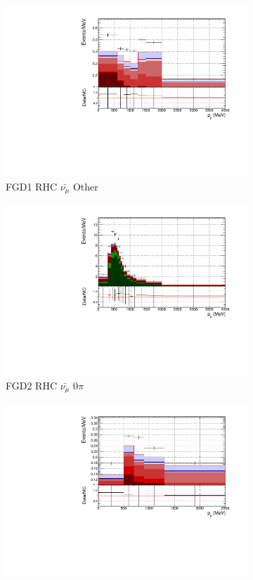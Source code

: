 \begin{figure}
\begin{subfigure}{.32\textwidth}
  \includegraphics[width=0.95\linewidth]{figs/FGD1_anti-numuCC_other_p}
  \caption{FGD1 RHC $\bar{\nu_{\mu}}$ Other}
  \label{fig:pstack_FGD1_anti-numuCC_other}
\end{subfigure}
\centering
\begin{subfigure}{.32\textwidth}
  \centering
  \includegraphics[width=0.95\linewidth]{figs/FGD2_anti-numuCC_0pi_p}
  \caption{FGD2 RHC $\bar{\nu_{\mu}}$ 0$\pi$}
  \label{fig:pstack_FGD2_anti-numuCC_0pi}
\end{subfigure}
\begin{subfigure}{.32\textwidth}
  \centering
  \includegraphics[width=0.95\linewidth]{figs/FGD2_anti-numuCC_1pi_p}

\end{subfigure}
\end{figure}
